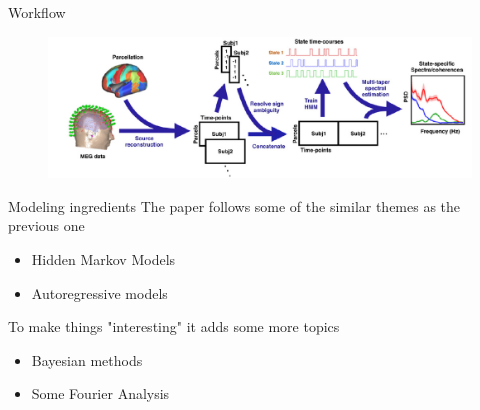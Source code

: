 \documentclass{beamer}
\begin{document}
	
%		
%		
%		
%	
%	
	\begin{frame}{Workflow}
	
		
		\begin{figure}[h]
			\centering
				\includegraphics[scale=0.5]{../Figures/fig_vidaurre2_1.png}
		\end{figure}
	\end{frame}
\begin{frame}{Modeling ingredients}
	The paper follows some of the similar themes as the previous one
	\begin{itemize}
		\item Hidden Markov Models
		\item Autoregressive models
	\end{itemize}
To make things "interesting" it adds some more topics
\begin{itemize}
	\item Bayesian methods
	\item Some Fourier Analysis
\end{itemize}

\end{frame}
\end{document}
